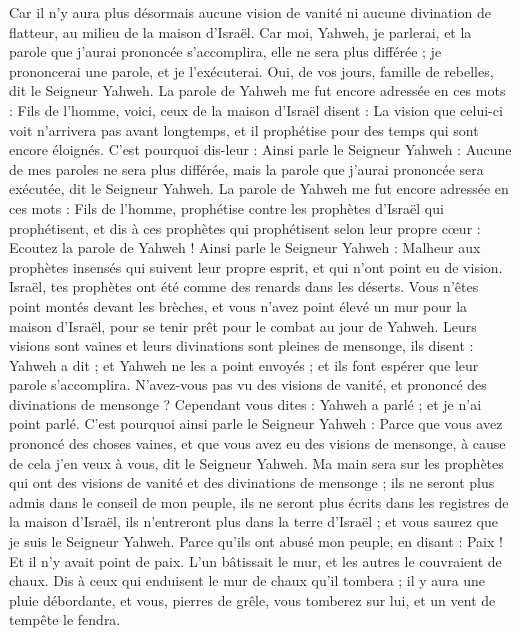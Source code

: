 \begin{multicols}{2}
Car il n'y aura plus désormais aucune vision de vanité ni aucune divination de flatteur, au milieu de la maison d'Israël.
Car moi, Yahweh, je parlerai, et la parole que j'aurai prononcée s’accomplira, elle ne sera plus différée ; je prononcerai une parole, et je l'exécuterai. Oui, de vos jours, famille de rebelles, dit le Seigneur Yahweh.
La parole de Yahweh me fut encore adressée en ces mots :
Fils de l’homme, voici, ceux de la maison d'Israël disent : La vision que celui-ci voit n'arrivera pas avant longtemps, et il prophétise pour des temps qui sont encore éloignés.
C'est pourquoi dis-leur : Ainsi parle le Seigneur Yahweh : Aucune de mes paroles ne sera plus différée, mais la parole que j'aurai prononcée sera exécutée, dit le Seigneur Yahweh.
\VerseOne{}La parole de Yahweh me fut encore adressée en ces mots :
Fils de l’homme, prophétise contre les prophètes d'Israël qui prophétisent, et dis à ces prophètes qui prophétisent selon leur propre cœur : Ecoutez la parole de Yahweh !
Ainsi parle le Seigneur Yahweh : Malheur aux prophètes  insensés qui suivent leur propre esprit, et qui n'ont point eu de vision.
Israël, tes prophètes ont été comme des renards dans les déserts.
Vous n'êtes point montés devant les brèches, et vous n'avez point élevé un mur pour la maison d'Israël, pour se tenir prêt pour le combat au jour de Yahweh.
Leurs visions sont vaines et leurs divinations sont pleines de mensonge, ils disent : Yahweh a dit ; et Yahweh ne les a point envoyés ; et ils font espérer que leur parole s’accomplira.
N'avez-vous pas vu des visions de vanité, et prononcé des divinations de mensonge ? Cependant vous dites : Yahweh a parlé ; et je n'ai point parlé.
C'est pourquoi ainsi parle le Seigneur Yahweh : Parce que vous avez prononcé des choses vaines, et que vous avez eu des visions de mensonge, à cause de cela j'en veux à vous, dit le Seigneur Yahweh.
Ma main sera sur les prophètes qui ont des visions de vanité et des divinations de mensonge ; ils ne seront plus admis dans le conseil de mon peuple, ils ne seront plus écrits dans les registres de la maison d'Israël, ils n'entreront plus dans la terre d'Israël ; et vous saurez que je suis le Seigneur Yahweh.
Parce qu'ils ont abusé mon peuple, en disant : Paix ! Et il n'y avait point de paix. L'un bâtissait le mur, et les autres le couvraient de chaux.
Dis à ceux qui enduisent le mur de chaux qu'il tombera ; il y aura une pluie débordante, et vous, pierres de grêle, vous tomberez sur lui, et un vent de tempête le fendra.

\end{multicols}
